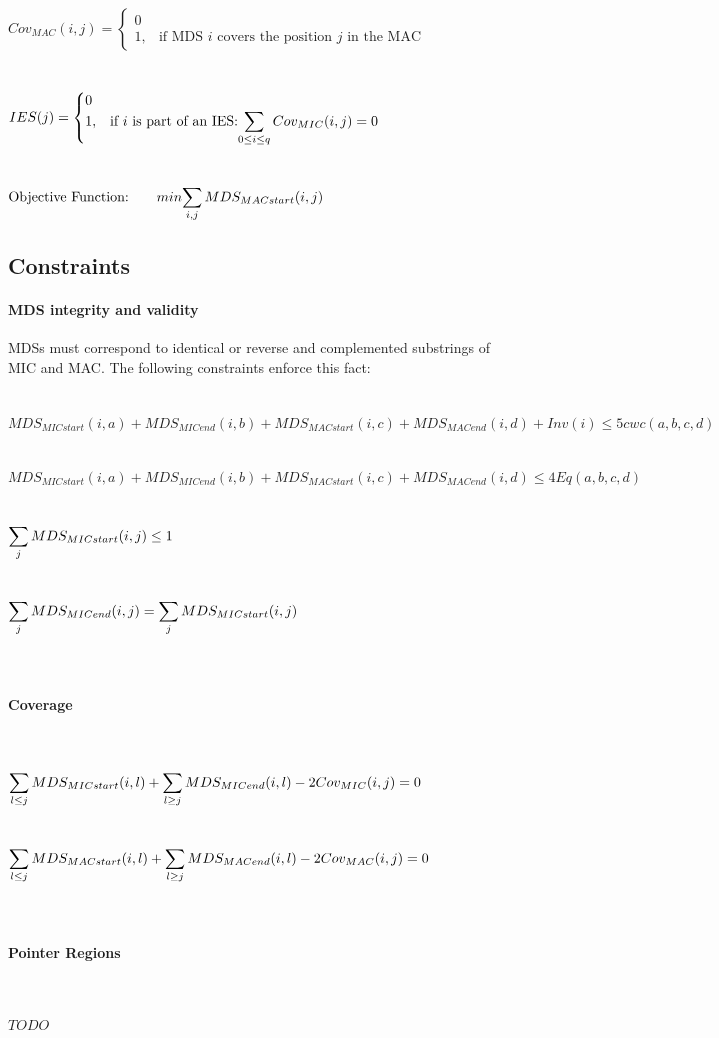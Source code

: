 $Cov_{MAC}(i,j) = \begin{cases} 0 \\ 1, & \mbox{if MDS } i\mbox{ covers the position } j \mbox{ in the MAC} \end{cases}$ \\\\\\
$IES(j) = \begin{cases} 0 \\ 1, & \mbox{if } i \mbox{ is part of an IES:} \mathlarger{\sum_{0 \leq i \leq q} Cov_{MIC}(i,j) = 0} \end{cases}$ \\\\\\

$\mbox{Objective Function:} \qquad min \mathlarger{\sum_{i,j} MDS_{MACstart}(i,j)}$

\subsection{Constraints}

\paragraph{MDS integrity and validity}MDSs must correspond to identical or reverse and complemented substrings of MIC and MAC. The following constraints enforce this fact:
\\\\\\
$MDS_{MICstart}(i,a) + MDS_{MICend}(i,b) + MDS_{MACstart}(i,c) + MDS_{MACend}(i,d) + Inv(i) \leq 5 cwc(a,b,c,d)$ \\\\\\
$MDS_{MICstart}(i,a) + MDS_{MICend}(i,b) + MDS_{MACstart}(i,c) + MDS_{MACend}(i,d) \leq 4 Eq(a,b,c,d)$ \\\\\\
$\mathlarger{\sum_{j} MDS_{MICstart}(i,j)\leq 1}$ \\\\\\
$\mathlarger{\sum_{j} MDS_{MICend}(i,j) = \sum_{j} MDS_{MICstart}(i,j)}$ \\\\\\

\paragraph{Coverage} $ $
\\\\\\
$\mathlarger{\sum_{l\leq j} MDS_{MICstart}(i,l) + \sum_{l\geq j}MDS_{MICend}(i,l) - 2Cov_{MIC}(i,j) = 0}$ \\\\\\
$\mathlarger{\sum_{l\leq j} MDS_{MACstart}(i,l) + \sum_{l\geq j}MDS_{MACend}(i,l) - 2Cov_{MAC}(i,j) = 0}$ \\\\\\

\paragraph{Pointer Regions} $ $
\\\\\\
$ TODO $